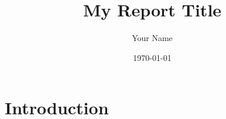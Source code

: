 \documentclass[12pt]{report}
\begin{document}
\title{My Report Title}
\author{Your Name}
\date{\today}

\maketitle
\tableofcontents
\clearpage

\chapter{Introduction}

%

\printbibliography %
\end{document}
